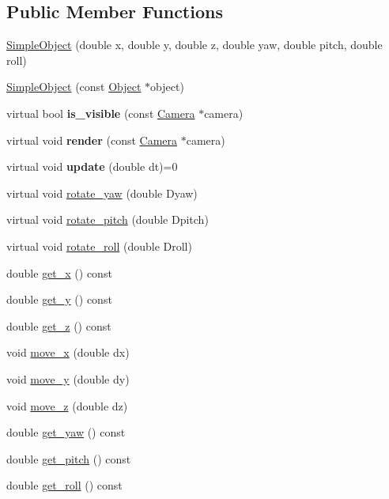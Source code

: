 \subsection*{Public Member Functions}
\begin{DoxyCompactItemize}
\item 
\hyperlink{class_simple_object_ac3546137e54ecbd63af642987ed7c3e1}{Simple\+Object} (double x, double y, double z, double yaw, double pitch, double roll)
\item 
\hyperlink{class_simple_object_aa5c0c6312bf39207eccbe3816218c16c}{Simple\+Object} (const \hyperlink{class_object}{Object} $\ast$object)
\item 
virtual bool {\bfseries is\+\_\+visible} (const \hyperlink{class_camera}{Camera} $\ast$camera)\hypertarget{class_simple_object_a1ecfe7d2d9f54db74b5add72bde4722f}{}\label{class_simple_object_a1ecfe7d2d9f54db74b5add72bde4722f}

\item 
virtual void {\bfseries render} (const \hyperlink{class_camera}{Camera} $\ast$camera)\hypertarget{class_simple_object_a3a27ab5c46fb29fe77bd7e8bd6a3f363}{}\label{class_simple_object_a3a27ab5c46fb29fe77bd7e8bd6a3f363}

\item 
virtual void {\bfseries update} (double dt)=0\hypertarget{class_simple_object_ae6172a3cb957cb595fd77effbb051bde}{}\label{class_simple_object_ae6172a3cb957cb595fd77effbb051bde}

\item 
virtual void \hyperlink{class_simple_object_a87202d586ed9a3c115dedcad2911f7b7}{rotate\+\_\+yaw} (double Dyaw)
\item 
virtual void \hyperlink{class_simple_object_aaf69740e2c939f7e0b51924a89422f0c}{rotate\+\_\+pitch} (double Dpitch)
\item 
virtual void \hyperlink{class_simple_object_ae2df7e8abff1303b55f559102b08a2c5}{rotate\+\_\+roll} (double Droll)
\item 
double \hyperlink{class_simple_object_a41bbdfe52dc20d88ba6511208867d908}{get\+\_\+x} () const 
\item 
double \hyperlink{class_simple_object_ac1f8fa29e45089a4110848ddaf440322}{get\+\_\+y} () const 
\item 
double \hyperlink{class_simple_object_a4a7931d70d156e0254d3ccfa1a6f2f4d}{get\+\_\+z} () const 
\item 
void \hyperlink{class_simple_object_a4c07cb27c02089325fd65dee3218563c}{move\+\_\+x} (double dx)
\item 
void \hyperlink{class_simple_object_acb544eaea6d132ddf29db57ada174920}{move\+\_\+y} (double dy)
\item 
void \hyperlink{class_simple_object_a9d5854c99305702d0b1ceaf7a24907fc}{move\+\_\+z} (double dz)
\item 
double \hyperlink{class_simple_object_a5fdb2d7aa58fcad8acb1fcaf906dce15}{get\+\_\+yaw} () const 
\item 
double \hyperlink{class_simple_object_a5fdf130ef90fe9a645887f6735f2ce70}{get\+\_\+pitch} () const 
\item 
double \hyperlink{class_simple_object_adf120ce1354dbbaed33b437206936541}{get\+\_\+roll} () const 
\end{DoxyCompactItemize}
